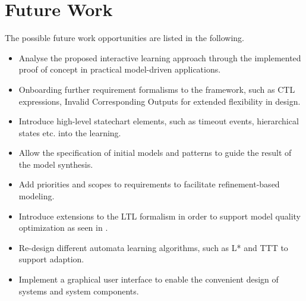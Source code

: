 \section{Future Work}
The possible future work opportunities are listed in the following.

\begin{itemize}
	\item Analyse the proposed interactive learning approach through the implemented proof of concept in practical model-driven applications.
	\item Onboarding further requirement formalisms to the framework, such as CTL expressions, Invalid Corresponding Outputs for extended flexibility in design.
	\item Introduce high-level statechart elements, such as timeout events, hierarchical states etc. into the learning.
	\item Allow the specification of initial models and patterns to guide the result of the model synthesis.
	\item Add priorities and scopes to requirements to facilitate refinement-based modeling.
	\item Introduce extensions to the LTL formalism in order to support model quality optimization as seen in \cite{kupferman}.
	\item Re-design different automata learning algorithms, such as L*\cite{ANGLUIN198787} and TTT\cite{10.1007/978-3-319-11164-3_26} to support adaption.
	\item Implement a graphical user interface to enable the convenient design of systems and system components.
\end{itemize}